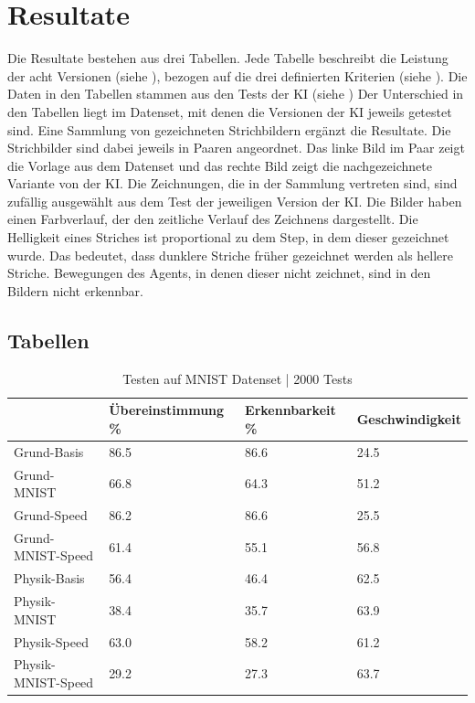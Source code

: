 \chapter{Resultate}\label{chap:r}
Die Resultate bestehen aus drei Tabellen. Jede Tabelle beschreibt die Leistung
der acht Versionen (siehe ), bezogen auf die drei definierten
Kriterien (siehe ). Die Daten in den Tabellen
stammen aus den Tests der KI (siehe )
Der Unterschied in den Tabellen liegt im Datenset, mit denen die Versionen der
KI jeweils getestet sind. 
Eine Sammlung von gezeichneten Strichbildern ergänzt die Resultate. Die
Strichbilder sind dabei jeweils in Paaren angeordnet. Das linke Bild im Paar
zeigt die Vorlage aus dem Datenset und das rechte Bild zeigt die nachgezeichnete
Variante von der KI. Die Zeichnungen, die in der Sammlung
vertreten sind, sind zufällig ausgewählt aus dem Test der jeweiligen Version der
KI. Die Bilder haben einen Farbverlauf, der den zeitliche
Verlauf des Zeichnens dargestellt. Die Helligkeit eines Striches ist
proportional zu dem Step, in dem dieser gezeichnet wurde. Das bedeutet, dass
dunklere Striche früher gezeichnet werden als hellere Striche. Bewegungen des
Agents, in denen dieser nicht zeichnet, sind in den Bildern nicht erkennbar.

\newpage
\section{Tabellen}\label{chap:r_tab}
\begin{table}[!ht]
    \centering
    \caption{Testen auf MNIST Datenset | 2000 Tests}\label{tab:MNIST}
    \begin{tabular}{|l|l|l|l|}
        \hline
            ~ & Übereinstimmung \% & Erkennbarkeit \% & Geschwindigkeit \\ \hline
            Grund-Basis & 86.5 & 86.6 & 24.5 \\ \hline
            Grund-MNIST & 66.8 & 64.3 & 51.2 \\ \hline
            Grund-Speed & 86.2 & 86.6 & 25.5 \\ \hline
            Grund-MNIST-Speed & 61.4 & 55.1 & 56.8 \\ \hline
            Physik-Basis & 56.4 & 46.4 & 62.5 \\ \hline
            Physik-MNIST & 38.4 & 35.7 & 63.9 \\ \hline
            Physik-Speed & 63.0 & 58.2 & 61.2 \\ \hline
            Physik-MNIST-Speed & 29.2 & 27.3 & 63.7 \\ \hline
        \end{tabular}
\end{table}

